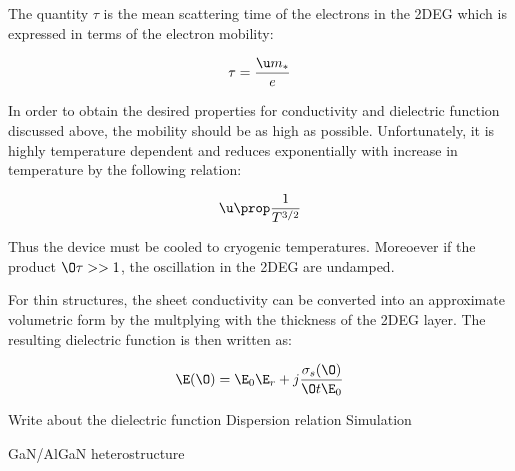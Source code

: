 The quantity $\tau$ is the mean scattering time of the electrons in the 2DEG which is expressed in terms of the electron mobility:

\begin{equation}
  \tau = \frac{\u m_{\ast}}{e}
  \label{eq:tau}
\end{equation}

In order to obtain the desired properties for conductivity and dielectric function discussed above, the mobility should be as high as possible. Unfortunately, it is highly temperature dependent and reduces exponentially with increase in temperature by the following relation:

\begin{equation}
  \u \prop \frac{1}{T^{3/2}}
  \label{eq:uT}
\end{equation}

Thus the device must be cooled to cryogenic temperatures. Moreoever if the product $\O \tau >> 1$, the oscillation in the 2DEG are undamped.

For thin structures, the sheet conductivity can be converted into an approximate volumetric form by the multplying with the thickness of the 2DEG layer. The resulting dielectric function is then written as:

\begin{equation}
  \E(\O) = \E_0 \E_r + j\frac{\sigma_s(\O)}{\O t \E_0}
\end{equation}

Write about the dielectric function
Dispersion relation
Simulation

GaN/AlGaN heterostructure
